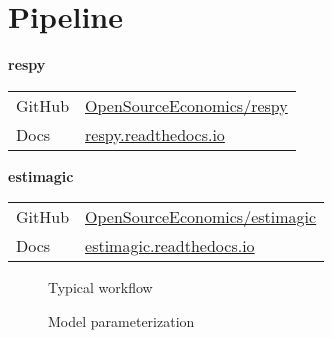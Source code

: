 \section{Pipeline}
\begin{frame}{\insertsection}
\textbf{respy}\\
\medskip
\begin{tabular}{ll}
GitHub  & \url{OpenSourceEconomics/respy}\\
Docs    & \url{respy.readthedocs.io}\\
\end{tabular}\bigskip

\textbf{estimagic}\\
\medskip
\begin{tabular}{ll}
GitHub	& \url{OpenSourceEconomics/estimagic}\\
Docs    & \url{estimagic.readthedocs.io}\\
\end{tabular}

\end{frame}
\begin{frame}{\insertsection}
	\begin{figure}
	   
	   \caption{Typical workflow}
   \end{figure}
\end{frame}
\begin{frame}{\insertsection}

	\begin{figure}[h!]\centering
	\caption{Model parameterization}\label{Model parameterization}
	\end{figure}

\end{frame}
